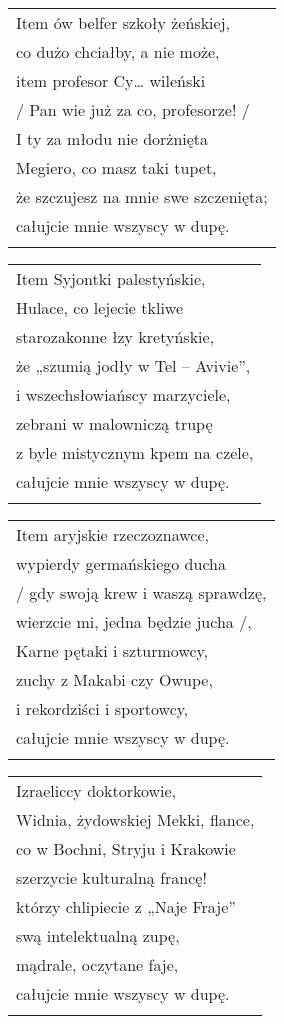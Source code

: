 \documentclass[a5paper]{article}
\begin{document}
\noindent
\begin{tabular}{@{}p{9.5cm}@{}}
Item ów belfer szkoły żeńskiej, \\
co dużo chciałby, a nie może, \\
item profesor Cy… wileński \\
/ Pan wie już za co, profesorze! / \\
I ty za młodu nie dorżnięta \\
Megiero, co masz taki tupet, \\
że szczujesz na mnie swe szczenięta; \\
całujcie mnie wszyscy w dupę. \\ \\
\end{tabular}

\noindent
\begin{tabular}{@{}p{9.5cm}@{}}
Item Syjontki palestyńskie, \\
Hulace, co lejecie tkliwe \\
starozakonne łzy kretyńskie, \\
że „szumią jodły w Tel – Avivie”, \\
i wszechsłowiańscy marzyciele, \\
zebrani w malowniczą trupę \\
z byle mistycznym kpem na czele, \\
całujcie mnie wszyscy w dupę. \\ \\
\end{tabular}

\noindent
\begin{tabular}{@{}p{9.5cm}@{}}
Item aryjskie rzeczoznawce, \\
wypierdy germańskiego ducha \\
/ gdy swoją krew i waszą sprawdzę, \\
wierzcie mi, jedna będzie jucha /, \\
Karne pętaki i szturmowcy, \\
zuchy z Makabi czy Owupe, \\
i rekordziści i sportowcy, \\
całujcie mnie wszyscy w dupę. \\ \\
\end{tabular}

\noindent
\begin{tabular}{@{}p{9.5cm}@{}}
Izraeliccy doktorkowie, \\
Widnia, żydowskiej Mekki, flance, \\
co w Bochni, Stryju i Krakowie \\
szerzycie kulturalną francę! \\
którzy chlipiecie z „Naje Fraje” \\
swą intelektualną zupę, \\
mądrale, oczytane faje, \\
całujcie mnie wszyscy w dupę. \\ \\
\end{tabular}
\end{document}
